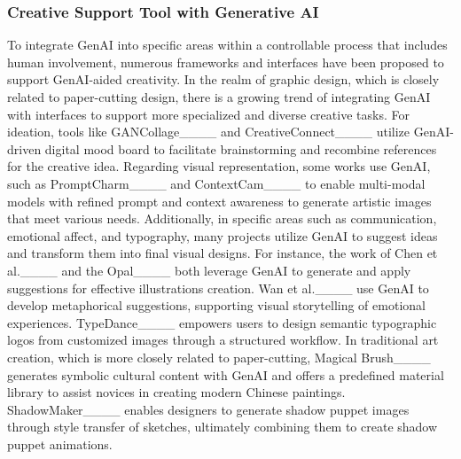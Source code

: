 
\subsubsection{Creative Support Tool with Generative AI}
To integrate GenAI into specific areas within a controllable process that includes human involvement, numerous frameworks and interfaces have been proposed to support GenAI-aided creativity.
In the realm of graphic design, which is closely related to paper-cutting design, there is a growing trend of integrating GenAI with interfaces to support more specialized and diverse creative tasks. For ideation, tools like GANCollage____ and CreativeConnect____ utilize GenAI-driven digital mood board to facilitate brainstorming and recombine references for the creative idea.
Regarding visual representation, some works use GenAI, such as PromptCharm____ and ContextCam____ to enable multi-modal models with refined prompt and context awareness to generate artistic images that meet various needs. 
Additionally, in specific areas such as communication, emotional affect, and typography, many projects utilize GenAI to suggest ideas and transform them into final visual designs. For instance, the work of Chen et al.____ and the Opal____ both leverage GenAI to generate and apply suggestions for effective illustrations creation. Wan et al.____ use GenAI to develop metaphorical suggestions, supporting visual storytelling of emotional experiences. TypeDance____ empowers users to design semantic typographic logos from customized images through a structured workflow.
In traditional art creation, which is more closely related to paper-cutting, Magical Brush____ generates symbolic cultural content with GenAI and offers a predefined material library to assist novices in creating modern Chinese paintings. ShadowMaker____ enables designers to generate shadow puppet images through style transfer of sketches, ultimately combining them to create shadow puppet animations.
